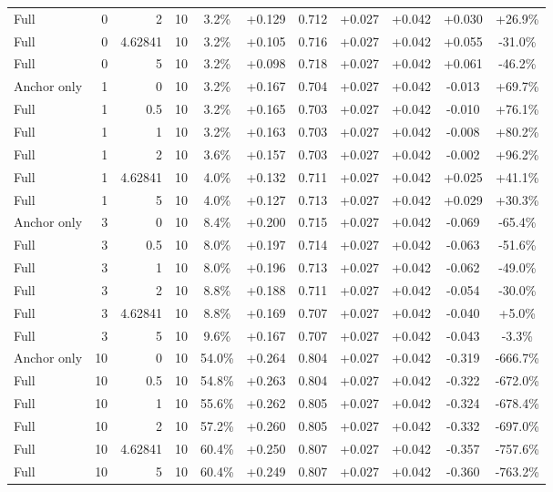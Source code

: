 \begin{table}[htbp]
\begin{tabular}{lrrrccccccc}
Full & 0 & 2 & 10 & 3.2\% & +0.129 & 0.712 & +0.027 & +0.042 & +0.030 & +26.9\% \\
Full & 0 & 4.62841 & 10 & 3.2\% & +0.105 & 0.716 & +0.027 & +0.042 & +0.055 & -31.0\% \\
Full & 0 & 5 & 10 & 3.2\% & +0.098 & 0.718 & +0.027 & +0.042 & +0.061 & -46.2\% \\
Anchor only & 1 & 0 & 10 & 3.2\% & +0.167 & 0.704 & +0.027 & +0.042 & -0.013 & +69.7\% \\
Full & 1 & 0.5 & 10 & 3.2\% & +0.165 & 0.703 & +0.027 & +0.042 & -0.010 & +76.1\% \\
Full & 1 & 1 & 10 & 3.2\% & +0.163 & 0.703 & +0.027 & +0.042 & -0.008 & +80.2\% \\
Full & 1 & 2 & 10 & 3.6\% & +0.157 & 0.703 & +0.027 & +0.042 & -0.002 & +96.2\% \\
Full & 1 & 4.62841 & 10 & 4.0\% & +0.132 & 0.711 & +0.027 & +0.042 & +0.025 & +41.1\% \\
Full & 1 & 5 & 10 & 4.0\% & +0.127 & 0.713 & +0.027 & +0.042 & +0.029 & +30.3\% \\
Anchor only & 3 & 0 & 10 & 8.4\% & +0.200 & 0.715 & +0.027 & +0.042 & -0.069 & -65.4\% \\
Full & 3 & 0.5 & 10 & 8.0\% & +0.197 & 0.714 & +0.027 & +0.042 & -0.063 & -51.6\% \\
Full & 3 & 1 & 10 & 8.0\% & +0.196 & 0.713 & +0.027 & +0.042 & -0.062 & -49.0\% \\
Full & 3 & 2 & 10 & 8.8\% & +0.188 & 0.711 & +0.027 & +0.042 & -0.054 & -30.0\% \\
Full & 3 & 4.62841 & 10 & 8.8\% & +0.169 & 0.707 & +0.027 & +0.042 & -0.040 & +5.0\% \\
Full & 3 & 5 & 10 & 9.6\% & +0.167 & 0.707 & +0.027 & +0.042 & -0.043 & -3.3\% \\
Anchor only & 10 & 0 & 10 & 54.0\% & +0.264 & 0.804 & +0.027 & +0.042 & -0.319 & -666.7\% \\
Full & 10 & 0.5 & 10 & 54.8\% & +0.263 & 0.804 & +0.027 & +0.042 & -0.322 & -672.0\% \\
Full & 10 & 1 & 10 & 55.6\% & +0.262 & 0.805 & +0.027 & +0.042 & -0.324 & -678.4\% \\
Full & 10 & 2 & 10 & 57.2\% & +0.260 & 0.805 & +0.027 & +0.042 & -0.332 & -697.0\% \\
Full & 10 & 4.62841 & 10 & 60.4\% & +0.250 & 0.807 & +0.027 & +0.042 & -0.357 & -757.6\% \\
Full & 10 & 5 & 10 & 60.4\% & +0.249 & 0.807 & +0.027 & +0.042 & -0.360 & -763.2\% \\

\end{tabular}
\end{table}
